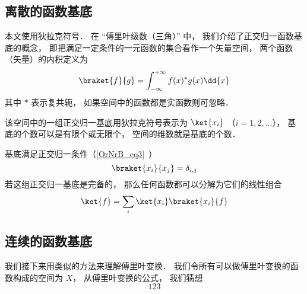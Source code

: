

\subsection{离散的函数基底}
本文使用狄拉克符号． 在 “傅里叶级数（三角）” 中， 我们介绍了正交归一函数基底的概念， 即把满足一定条件的一元函数的集合看作一个矢量空间， 两个函数（矢量）的内积定义为
\begin{equation}
\braket{f}{g} = \int_{-\infty}^{+\infty} f(x)^* g(x) \dd{x}
\end{equation}
其中 $*$ 表示复共轭， 如果空间中的函数都是实函数则可忽略．

该空间中的一组正交归一基底用狄拉克符号表示为 $\ket{x_i}$ （$i = 1, 2,\dots$）， 基底的个数可以是有限个或无限个， 空间的维数就是基底的个数．

基底满足正交归一条件（\autoref{OrNrB_eq3}~）
\begin{equation}
\braket{x_i}{x_j} = \delta_{i,j}
\end{equation}
若这组正交归一基底是完备的， 那么任何函数都可以分解为它们的线性组合
\begin{equation}
\ket{f} = \sum_i \ket{x_i}\braket{x_i}{f}
\end{equation}


\subsection{连续的函数基底}
我们接下来用类似的方法来理解傅里叶变换． 我们令所有可以做傅里叶变换的函数构成的空间为 $X$， 从傅里叶变换的公式， 我们猜想
\begin{equation}
123
\end{equation}

